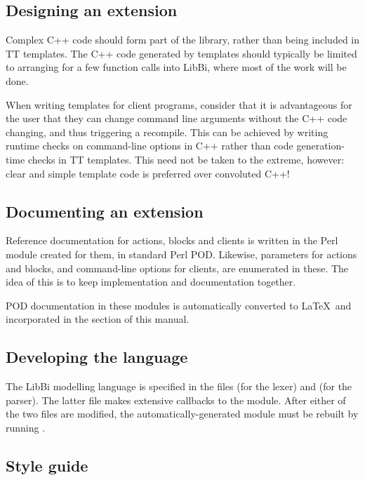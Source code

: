 \subsection{Designing an extension\label{Designing_an_extension}}

Complex C++ code should form part of the library, rather than being included
in TT templates. The C++ code generated by templates should typically be
limited to arranging for a few function calls into LibBi, where most of the
work will be done.

When writing templates for client programs, consider that it is advantageous
for the user that they can change command line arguments without the C++ code
changing, and thus triggering a recompile. This can be achieved by writing
runtime checks on command-line options in C++ rather than code generation-time
checks in TT templates. This need not be taken to the extreme, however: clear
and simple template code is preferred over convoluted C++!

\subsection{Documenting an extension\label{Documenting_an_extension}}

Reference documentation for actions, blocks and clients is written in the Perl
module created for them, in standard Perl POD. Likewise, parameters for
actions and blocks, and command-line options for clients, are enumerated in
these. The idea of this is to keep implementation and documentation together.

POD documentation in these modules is automatically converted to \LaTeX\ and
incorporated in the  section of this
manual.

\subsection{Developing the language\label{Developing_the_language}}

The LibBi modelling language is specified in the files 
(for the lexer) and  (for the parser). The latter file makes
extensive callbacks to the  module. After either of the two
files are modified, the automatically-generated  module must
be rebuilt by running .

\subsection{Style guide\label{Developer_style_guide}}

